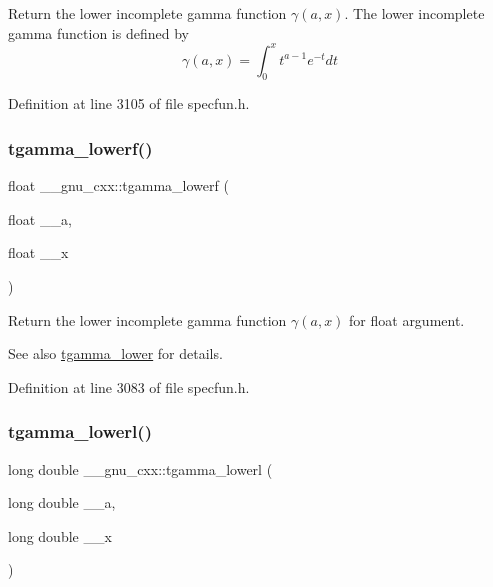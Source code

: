 Return the lower incomplete gamma function $ \gamma(a,x) $. The lower incomplete gamma function is defined by \[ \gamma(a,x) = \int_0^x t^{a-1}e^{-t}dt \] 

Definition at line 3105 of file specfun.\+h.

\mbox{\label{group__gnu__math__spec__func_ga8f2aabeaa29d21b19c43972efb26798c}} 
\subsubsection{\texorpdfstring{tgamma\+\_\+lowerf()}{tgamma\_lowerf()}}
{\footnotesize\ttfamily float \+\_\+\+\_\+gnu\+\_\+cxx\+::tgamma\+\_\+lowerf (\begin{DoxyParamCaption}\item[{float}]{\+\_\+\+\_\+a,  }\item[{float}]{\+\_\+\+\_\+x }\end{DoxyParamCaption})\hspace{0.3cm}{\ttfamily [inline]}}

Return the lower incomplete gamma function $ \gamma(a,x) $ for {\ttfamily float} argument.

\begin{DoxySeeAlso}{See also}
\hyperlink{group__gnu__math__spec__func_gaed107908dec8865ea48e7764f7ea88a2}{tgamma\+\_\+lower} for details. 
\end{DoxySeeAlso}


Definition at line 3083 of file specfun.\+h.

\mbox{\label{group__gnu__math__spec__func_gad057fe49a5bf95b1550f5f0a6e60bb19}} 
\subsubsection{\texorpdfstring{tgamma\+\_\+lowerl()}{tgamma\_lowerl()}}
{\footnotesize\ttfamily long double \+\_\+\+\_\+gnu\+\_\+cxx\+::tgamma\+\_\+lowerl (\begin{DoxyParamCaption}\item[{long double}]{\+\_\+\+\_\+a,  }\item[{long double}]{\+\_\+\+\_\+x }\end{DoxyParamCaption})\hspace{0.3cm}{\ttfamily [inline]}}

